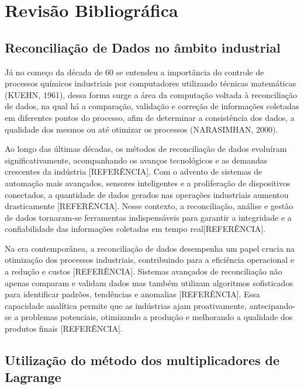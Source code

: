 \chapter[Revisão Bibliográfica]{Revisão Bibliográfica}

\section{Reconciliação de Dados no âmbito industrial}

Já no começo da década de 60 se entendeu a importância do controle de processos químicos industriais por computadores utilizando técnicas matemáticas (KUEHN, 1961), dessa forma surge a área da computação voltada à reconciliação de dados, na qual há a comparação, validação e correção de informações coletadas em diferentes pontos do processo, afim de determinar a consistência dos dados, a qualidade dos mesmos ou até otimizar os processos (NARASIMHAN, 2000).

Ao longo das últimas décadas, os métodos de reconciliação de dados evoluíram significativamente, acompanhando os avanços tecnológicos e as demandas crescentes da indústria [REFERÊNCIA]. Com o advento de sistemas de automação mais avançados, sensores inteligentes e a proliferação de dispositivos conectados, a quantidade de dados gerados nas operações industriais aumentou drasticamente [REFERÊNCIA]. Nesse contexto, a reconciliação, análise e gestão de dados tornaram-se ferramentas indispensáveis para garantir a integridade e a confiabilidade das informações coletadas em tempo real[REFERÊNCIA].

Na era contemporânea, a reconciliação de dados desempenha um papel crucia na otimização dos processos industriais, contribuindo para a eficiência operacional e a redução e custos [REFERÊNCIA]. Sistemas avançados de reconciliação não apenas comparam e validam dados mas também utilizam algoritmos sofisticados para identificar padrões, tendências e anomalias [REFERÊNCIA]. Essa capacidade analítica permite que as indústrias ajam proativamente, antecipando-se a problemas potenciais, otimizando a produção e melhorando a qualidade dos produtos finais [REFERÊNCIA].

\section{Utilização do método dos multiplicadores de Lagrange}

